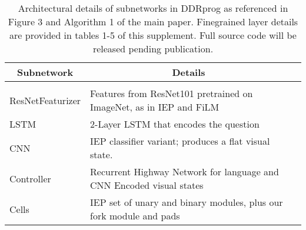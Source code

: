 \documentclass{article}
\begin{document}
\begin{table*}[ht]
\caption{Architectural details of subnetworks in DDRprog as referenced in Figure 3 and Algorithm 1 of the main paper. Finegrained layer details are provided in tables 1-5 of this supplement. Full source code will be released pending publication.}
\label{sample-table}
\begin{center}
\begin{tabular}{lll}
\multicolumn{1}{c}{\bf Subnetwork}  &\multicolumn{1}{c}{\bf Details}
\\ \hline \\
ResNetFeaturizer	&Features from ResNet101 pretrained on ImageNet, as in IEP and FiLM \\
LSTM 				&2-Layer LSTM that encodes the question \\
CNN 				&IEP classifier variant; produces a flat visual state. \\
Controller 			&Recurrent Highway Network for language and CNN Encoded visual states\\
Cells				&IEP set of unary and binary modules, plus our fork module and pads
\end{tabular}
\end{center}
\end{table*}
\vspace{1cm}
\end{document}
